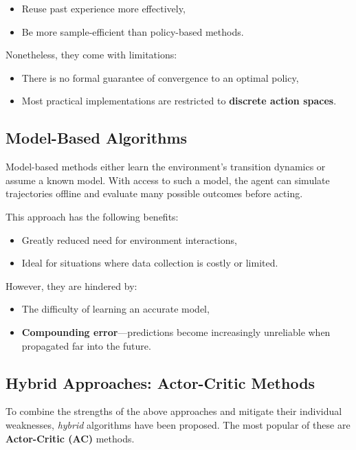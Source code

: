 \documentclass[a4paper,oneside]{book}
\theoremstyle{definition}
\begin{document}
\begin{itemize}
    \item Reuse past experience more effectively,
    \item Be more sample-efficient than policy-based methods.
\end{itemize}

Nonetheless, they come with limitations:

\begin{itemize}
    \item There is no formal guarantee of convergence to an optimal policy,
    \item Most practical implementations are restricted to \textbf{discrete action spaces}.
\end{itemize}

\subsection*{Model-Based Algorithms}

Model-based methods either learn the environment's transition dynamics or assume a known model. With access to such a model, the agent can simulate trajectories offline and evaluate many possible outcomes before acting.

This approach has the following benefits:

\begin{itemize}
    \item Greatly reduced need for environment interactions,
    \item Ideal for situations where data collection is costly or limited.
\end{itemize}

However, they are hindered by:

\begin{itemize}
    \item The difficulty of learning an accurate model,
    \item \textbf{Compounding error}—predictions become increasingly unreliable when propagated far into the future.
\end{itemize}

\subsection*{Hybrid Approaches: Actor-Critic Methods}

To combine the strengths of the above approaches and mitigate their individual weaknesses, \textit{hybrid} algorithms have been proposed. The most popular of these are \textbf{Actor-Critic (AC)} methods.
\end{document}
